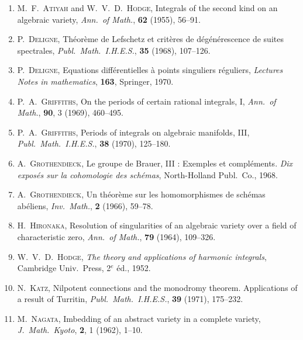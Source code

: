 \documentclass[11pt]{amsart}
\theoremstyle{plain}
\theoremstyle{remark}
\begin{document}
    \begin{enumerate}
    \renewcommand{\labelenumi}{\emph{[\theenumi]}}
    \item M.~F.~\textsc{Atiyah} and W.~V.~D.~\textsc{Hodge}, Integrals of the second kind on an
    algebraic variety, \emph{Ann.\ of Math.}, \textbf{62} (1955), 56--91.

    \item P.~\textsc{Deligne}, Th\'eor\`eme de Lefschetz et crit\`eres de d\'eg\'en\'erescence de suites
    spectrales, \emph{Publ.\ Math.\ I.H.E.S.}, \textbf{35} (1968), 107--126.

    \item P.~\textsc{Deligne}, Equations diff\'erentielles \`a points singuliers r\'eguliers,
    \emph{Lectures Notes in mathematics}, \textbf{163}, Springer, 1970.

    \item P.~A.~\textsc{Griffiths}, On the periods of certain rational integrals, I, \emph{Ann.\ of
    Math.}, \textbf{90}, 3 (1969), 460--495.

    \item P.~A.~\textsc{Griffiths}, Periods of integrals on algebraic manifolds, III, \emph{Publ.\ Math.\ I.H.E.S.}, \textbf{38} (1970), 125--180.

    \item A.~\textsc{Grothendieck}, Le groupe de Brauer, III : Exemples et compl\'ements. \emph{Dix
    expos\'es sur la cohomologie des sch\'emas}, North-Holland Publ.\ Co., 1968.

    \item A.~\textsc{Grothendieck}, Un th\'eor\`eme sur les homomorphismes de sch\'emas ab\'eliens,
    \emph{Inv.\ Math.}, \textbf{2} (1966), 59--78.

    \item H.~\textsc{Hironaka}, Resolution of singularities of an algebraic variety over a field of
    characteristic zero, \emph{Ann.\ of Math.}, \textbf{79} (1964), 109--326.

    \item W.~V.~D.~\textsc{Hodge}, \emph{The theory and applications of harmonic integrals},
    Cambridge Univ.\ Press, 2$^{e}$ \'ed., 1952.

    \item N.~\textsc{Katz}, Nilpotent connections and the monodromy theorem. Applications of a
    result of Turritin, \emph{Publ.\ Math.\ I.H.E.S.}, \textbf{39} (1971), 175--232.

    \item M.~\textsc{Nagata}, Imbedding of an abstract variety in a complete variety, \emph{J.\ Math.\
    Kyoto}, \textbf{2}, 1 (1962), 1--10.


\end{enumerate}
\end{document}
